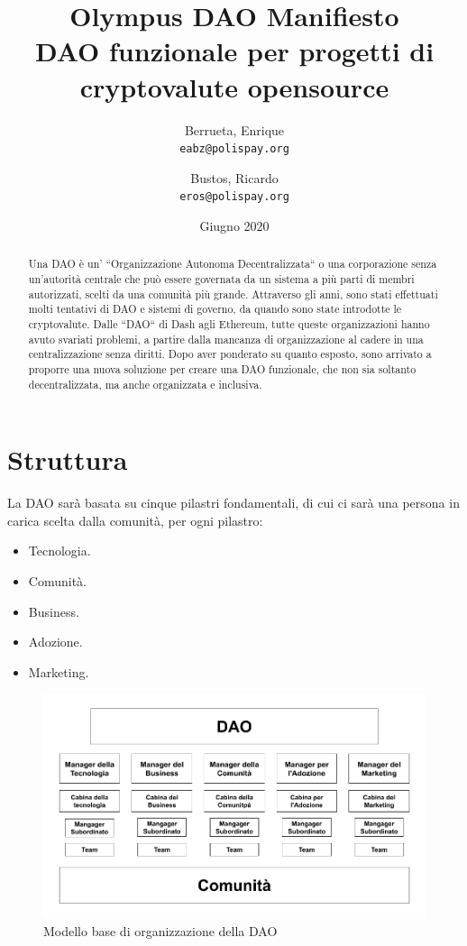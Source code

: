 \documentclass{article}
\title{%
  Olympus DAO Manifiesto \\
  \large DAO funzionale per progetti di cryptovalute opensource }
\author{
  Berrueta, Enrique\\
  \texttt{eabz@polispay.org}
  \and
  Bustos, Ricardo\\
  \texttt{eros@polispay.org}
}
\date{Giugno 2020}
\begin{document}
\maketitle

	\begin{abstract}
	Una DAO è un' ``Organizzazione Autonoma Decentralizzata`` o una corporazione senza un'autorità centrale che può essere governata da un sistema a più parti di membri autorizzati, scelti da una comunità più grande.  Attraverso gli anni, sono stati effettuati molti tentativi di DAO e sistemi di governo, da quando sono state introdotte le cryptovalute. Dalle ``DAO`` di Dash agli Ethereum, tutte queste organizzazioni hanno avuto svariati problemi, a partire dalla mancanza di organizzazione al cadere in una centralizzazione senza diritti. Dopo aver ponderato su quanto esposto, sono arrivato a proporre una nuova soluzione per creare una DAO funzionale, che non sia soltanto decentralizzata, ma anche organizzata e inclusiva.
	\end{abstract}

\newpage

\tableofcontents


\newpage

\section{Struttura}

La DAO sarà basata su cinque pilastri fondamentali, di cui ci sarà una persona in carica scelta dalla comunità, per ogni pilastro:

\begin{itemize}
  \item Tecnologia.
  \item Comunità.
  \item Business.
  \item Adozione.
  \item Marketing.
\end{itemize}

\begin{figure}[h]
\includegraphics[scale=0.4]{img/dao_structure_it.png}
\centering
\caption{Modello base di organizzazione della DAO}
\end{figure}
\end{document}
